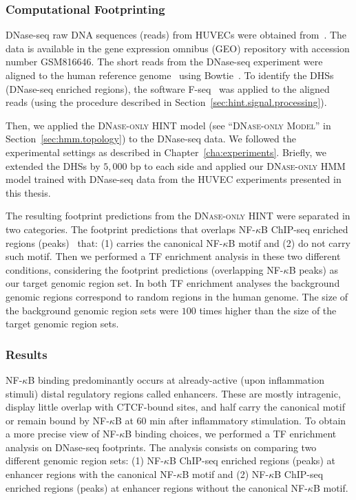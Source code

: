 \subsubsection{Computational Footprinting}

DNase-seq raw DNA sequences (reads) from HUVECs were obtained from~\cite{encode2012}. The data is available in the gene expression omnibus (GEO) repository with accession number GSM816646. The short reads from the DNase-seq experiment were aligned to the human reference genome~\citep{encode2012} using Bowtie~\citep{langmead2012}. To identify the DHSs (DNase-seq enriched regions), the software F-seq~\citep{boyle2008b} was applied to the aligned reads (using the procedure described in Section~\ref{sec:hint.signal.processing}).

Then, we applied the \textsc{DNase-only} HINT model (see ``\textsc{DNase-only Model}'' in Section~\ref{sec:hmm.topology}) to the DNase-seq data. We followed the experimental settings as described in Chapter~\ref{cha:experiments}. Briefly, we extended the DHSs by $5,000$ bp to each side and applied our \textsc{DNase-only} HMM model trained with DNase-seq data from the HUVEC experiments presented in this thesis.

The resulting footprint predictions from the \textsc{DNase-only} HINT were separated in two categories. The footprint predictions that overlaps NF-$\kappa$B ChIP-seq enriched regions (peaks)~\citep{papantonis2012} that: (1) carries the canonical NF-$\kappa$B motif and (2) do not carry such motif. Then we performed a TF enrichment analysis in these two different conditions, considering the footprint predictions (overlapping NF-$\kappa$B peaks) as our target genomic region set. In both TF enrichment analyses the background genomic regions correspond to random regions in the human genome. The size of the background genomic region sets were $100$ times higher than the size of the target genomic region sets.

\subsubsection{Results}

NF-$\kappa$B binding predominantly occurs at already-active (upon inflammation stimuli) distal regulatory regions called enhancers. These are mostly intragenic, display little overlap with CTCF-bound sites, and half carry the canonical motif or remain bound by NF-$\kappa$B at $60$ min after inflammatory stimulation. To obtain a more precise view of NF-$\kappa$B binding choices, we performed a TF enrichment analysis on DNase-seq footprints. The analysis consists on comparing two different genomic region sets: (1) NF-$\kappa$B ChIP-seq enriched regions (peaks) at enhancer regions with the canonical NF-$\kappa$B motif and (2) NF-$\kappa$B ChIP-seq enriched regions (peaks) at enhancer regions without the canonical NF-$\kappa$B motif.

